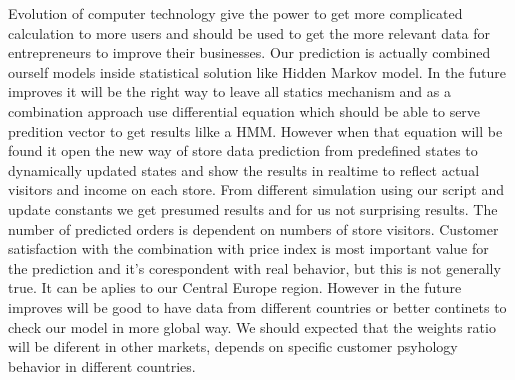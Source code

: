 Evolution of computer technology give the power to get more complicated calculation to more users and should be used to get the more relevant data for entrepreneurs to improve their businesses.
Our prediction is actually combined ourself models inside statistical solution like Hidden Markov model.
In the future improves it will be the right way to leave all statics mechanism and as a combination approach use differential equation which should be able to serve predition vector to get results lilke a HMM.
However when that equation will be found it open the new way of store data prediction from predefined states to dynamically updated states and show the results in realtime to reflect actual visitors and income on each store.
From different simulation using our script and update constants we get presumed results and for us not surprising results. The number of predicted orders is dependent on numbers of store visitors. Customer satisfaction with the combination with price index is most important value for the prediction and it's corespondent with real behavior, but this is not generally true. It can be aplies to our Central Europe region. However in the future improves will be good to have data from different countries or better continets to check our model in more global way.
We should expected that the weights ratio will be diferent in other markets, depends on specific customer psyhology behavior in different countries.